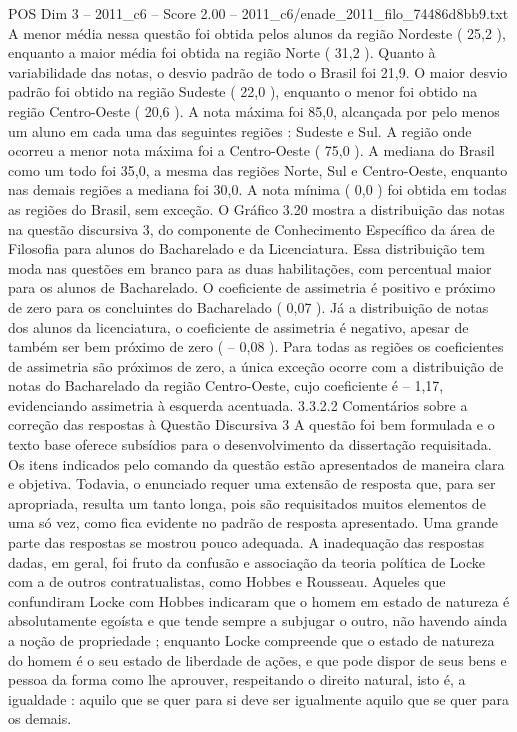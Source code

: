 \begin{textsample}{POS Dim 3 – 2011\_c6 – Score 2.00 – 2011\_c6/enade\_2011\_filo\_74486d8bb9.txt}
A menor média nessa questão foi obtida pelos alunos da região Nordeste ( 25,2 ), enquanto a maior média foi obtida na região Norte ( 31,2 ).
Quanto à variabilidade das notas, o desvio padrão de todo o Brasil foi 21,9.
O maior desvio padrão foi obtido na região Sudeste ( 22,0 ), enquanto o menor foi obtido na região Centro-Oeste ( 20,6 ).
A nota máxima foi 85,0, alcançada por pelo menos um aluno em cada uma das seguintes regiões : Sudeste e Sul.
A região onde ocorreu a menor nota máxima foi a Centro-Oeste ( 75,0 ).
A mediana do Brasil como um todo foi 35,0, a mesma das regiões Norte, Sul e Centro-Oeste, enquanto nas demais regiões a mediana foi 30,0.
A nota mínima ( 0,0 ) foi obtida em todas as regiões do Brasil, sem exceção.
O Gráfico 3.20 mostra a distribuição das notas na questão discursiva 3, do componente de Conhecimento Específico da área de Filosofia para alunos do Bacharelado e da Licenciatura.
Essa distribuição tem moda nas questões em branco para as duas habilitações, com percentual maior para os alunos de Bacharelado.
O coeficiente de assimetria é positivo e próximo de zero para os concluintes do Bacharelado ( 0,07 ).
Já a distribuição de notas dos alunos da licenciatura, o coeficiente de assimetria é negativo, apesar de também ser bem próximo de zero ( – 0,08 ).
Para todas as regiões os coeficientes de assimetria são próximos de zero, a única exceção ocorre com a distribuição de notas do Bacharelado da região Centro-Oeste, cujo coeficiente é – 1,17, evidenciando assimetria à esquerda acentuada. 3.3.2.2 Comentários sobre a correção das respostas à Questão Discursiva 3 A questão foi bem formulada e o texto base oferece subsídios para o desenvolvimento da dissertação requisitada.
Os itens indicados pelo comando da questão estão apresentados de maneira clara e objetiva.
Todavia, o enunciado requer uma extensão de resposta que, para ser apropriada, resulta um tanto longa, pois são requisitados muitos elementos de uma só vez, como fica evidente no padrão de resposta apresentado.
Uma grande parte das respostas se mostrou pouco adequada.
A inadequação das respostas dadas, em geral, foi fruto da confusão e associação da teoria política de Locke com a de outros contratualistas, como Hobbes e Rousseau.
Aqueles que confundiram Locke com Hobbes indicaram que o homem em estado de natureza é absolutamente egoísta e que tende sempre a subjugar o outro, não havendo ainda a noção de propriedade ; enquanto Locke compreende que o estado de natureza do homem é o seu estado de liberdade de ações, e que pode dispor de seus bens e pessoa da forma como lhe aprouver, respeitando o direito natural, isto é, a igualdade : aquilo que se quer para si deve ser igualmente aquilo que se quer para os demais.

\end{textsample}
